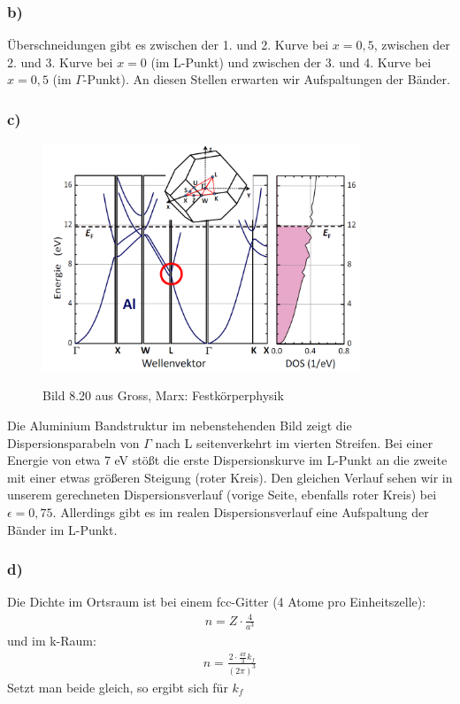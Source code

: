 \subsubsection*{b)}
Überschneidungen gibt es zwischen der 1. und 2. Kurve bei $x = 0,5$, zwischen der
2. und 3. Kurve bei $x = 0$ (im L-Punkt) und zwischen der 3. und 4. Kurve bei
$x = 0,5$ (im $\Gamma$-Punkt). An diesen Stellen erwarten wir Aufspaltungen der Bänder.
\newline
\newpage

\subsubsection*{c)}
\begin{figure}
  \centering
  \includegraphics[width=9.5cm]{aufgabe15c.png}
\label{bild15c}
\caption{Bild 8.20 aus Gross, Marx: Festkörperphysik}
\end{figure}
Die Aluminium Bandstruktur im nebenstehenden Bild zeigt die Dispersionsparabeln
von $\Gamma$ nach L seitenverkehrt im vierten Streifen. Bei einer Energie von etwa 7 eV
stößt die erste Dispersionskurve im L-Punkt an die zweite mit einer etwas größeren
Steigung (roter Kreis). Den gleichen Verlauf sehen wir in unserem
gerechneten Dispersionsverlauf (vorige Seite, ebenfalls roter Kreis) bei $\epsilon = 0,75$.
Allerdings gibt es im realen Dispersionsverlauf eine Aufspaltung der Bänder
im L-Punkt.
\newline

\subsubsection*{d)}
Die Dichte im Ortsraum ist bei einem fcc-Gitter (4 Atome pro Einheitszelle):
\begin{align*}
n = Z\cdot\frac{4}{a^3}
\end{align*}
und im k-Raum:
\begin{align*}
n = \frac{2\cdot\frac{4\pi}{3}k_f}{(2\pi)^3}
\end{align*}
Setzt man beide gleich, so ergibt sich für $k_f$


